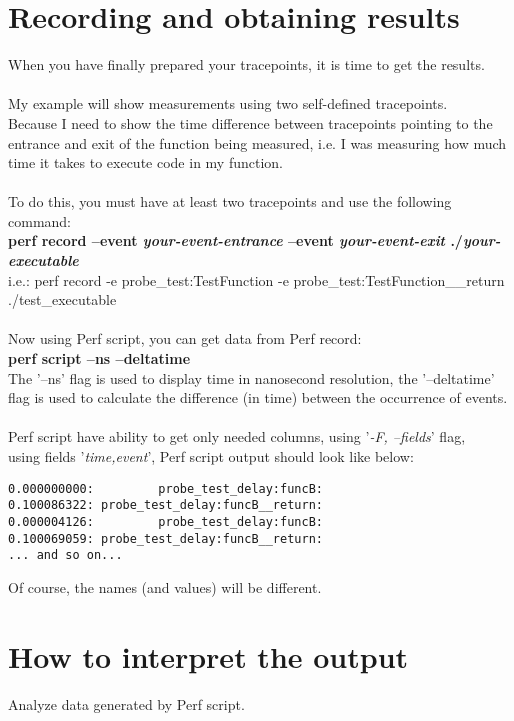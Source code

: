\documentclass[11pt,onecolumn]{article}
\begin{document}
\section{Recording and obtaining results}

When you have finally prepared your tracepoints, it is time to get the results.\\\\
My example will show measurements using two self-defined tracepoints.\\
Because I need to show the time difference between tracepoints pointing to the entrance and exit of the function being measured, i.e. I was measuring how much time it takes to execute code in my function.\\\\
To do this, you must have at least two tracepoints and use the following command:\\
\textbf{perf record --event \textit{your-event-entrance} --event \textit{your-event-exit} ./\textit{your-executable}}\\
i.e.: perf record -e probe\_test:TestFunction -e probe\_test:TestFunction\_\_return ./test\_executable\\\\
Now using Perf script, you can get data from Perf record:\\
\textbf{perf script --ns --deltatime}\\
The '--ns' flag is used to display time in nanosecond resolution, the '--deltatime' flag is used to calculate the difference (in time) between the occurrence of events.\\\\
Perf script have ability to get only needed columns, using '\textit{-F, --fields}' flag,\\
using fields '\textit{time,event}', Perf script output should look like below:
\begin{verbatim}
0.000000000:         probe_test_delay:funcB: 
0.100086322: probe_test_delay:funcB__return: 
0.000004126:         probe_test_delay:funcB: 
0.100069059: probe_test_delay:funcB__return:
... and so on...
\end{verbatim}
Of course, the names (and values) will be different.

\section{How to interpret the output}

Analyze data generated by Perf script.\\
\end{document}
